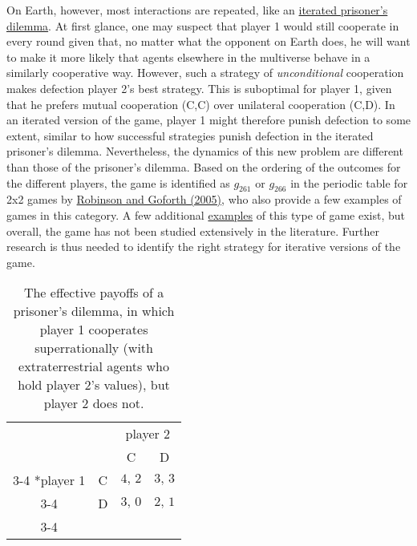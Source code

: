 On Earth, however, most interactions are
repeated, like an
\href{https://en.wikipedia.org/wiki/Prisoner\%27s_dilemma\#The_iterated_prisoner.27s_dilemma}{iterated
prisoner's dilemma}. At first glance, one may suspect that player 1
would still cooperate in every round given that, no matter what the
opponent on Earth does, he will want to make it more likely that agents
elsewhere in the multiverse behave in a similarly cooperative way.
However, such a strategy of \emph{unconditional} cooperation makes
defection player 2's best strategy. This is suboptimal for player 1,
given that he prefers mutual cooperation (C,C) over unilateral
cooperation (C,D). In an iterated version of the game, player 1 might
therefore punish defection to some extent, similar to how successful
strategies punish defection in the iterated prisoner's dilemma.
Nevertheless, the dynamics of this new problem are different than those
of the prisoner's dilemma. Based on the ordering of the outcomes for the
different players, the game is identified as \(g_{261}\) or \(g_{266}\)
in the periodic table for 2x2 games by
\href{https://sl4librarian.files.wordpress.com/2016/12/goforthrobinson-the-topology-of-the-2x2-games-a-new-periodic-table.pdf}{Robinson
and Goforth (2005)}, who also provide a few examples of games in this
category. A few additional
\href{http://infidels.org/library/modern/mathew/sn-revelation.html}{examples}
of this type of game exist, but overall, the game has not been studied
extensively in the literature. Further research is thus needed to
identify the right strategy for iterative versions of the game.

\renewcommand{\arraystretch}{1.5}
\begin{table}[h!]
    \centering
    \setlength{\extrarowheight}{2pt}
    \begin{tabular}{cc|c|c|}
      & \multicolumn{1}{c}{} & \multicolumn{2}{c}{player 2}\\
      & \multicolumn{1}{c}{} & \multicolumn{1}{c}{C}  & \multicolumn{1}{c}{D} \\\cline{3-4}
      \multirow{2}*{player 1}  & C & $4,\, 2$ & $3,\, 3$ \\\cline{3-4}
      & D & $3,\, 0$ & $2,\, 1$ \\\cline{3-4}
    \end{tabular}
    \caption{The effective payoffs
of a prisoner's dilemma, in which player 1 cooperates superrationally
(with extraterrestrial agents who hold player 2's values), but player 2
does not.}
    \label{PD-payoff-matrix-superrational-prisoner}
\end{table}

